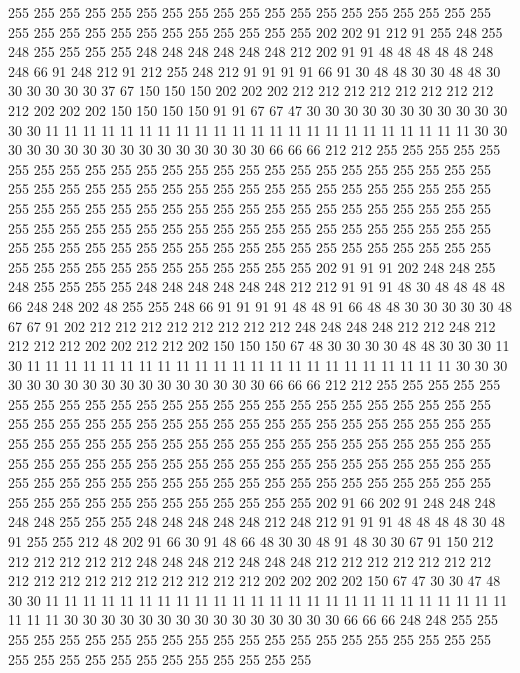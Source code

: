 255 255 255 255 255 255 255 255 255 255 255 255 255 255 255 255 255 255 255 255
255 255 255 255 255 255 255 255 255 255 255 202 202 91 212 91 255 248 255 248
255 255 255 255 248 248 248 248 248 248 212 202 91 91 48 48 48 48 48 248
248 66 91 248 212 91 212 255 248 212 91 91 91 91 66 91 30 48 48 30
30 48 48 30 30 30 30 30 30 37 67 150 150 150 202 202 202 212 212 212
212 212 212 212 212 212 202 202 202 150 150 150 150 91 91 67 67 47 30 30
30 30 30 30 30 30 30 30 30 30 30 11 11 11 11 11 11 11 11 11
11 11 11 11 11 11 11 11 11 11 11 11 11 11 30 30 30 30 30 30
30 30 30 30 30 30 30 30 30 30 66 66 66 212 212 255 255 255 255 255
255 255 255 255 255 255 255 255 255 255 255 255 255 255 255 255 255 255 255 255
255 255 255 255 255 255 255 255 255 255 255 255 255 255 255 255 255 255 255 255
255 255 255 255 255 255 255 255 255 255 255 255 255 255 255 255 255 255 255 255
255 255 255 255 255 255 255 255 255 255 255 255 255 255 255 255 255 255 255 255
255 255 255 255 255 255 255 255 255 255 255 255 255 255 255 255 255 255 255 255
255 255 255 255 255 255 255 202 91 91 91 202 248 248 255 248 255 255 255 255
248 248 248 248 248 248 212 212 91 91 91 48 30 48 48 48 48 66 248 248
202 48 255 255 248 66 91 91 91 91 48 48 91 66 48 48 30 30 30 30
30 48 67 67 91 202 212 212 212 212 212 212 212 212 248 248 248 248 212 212
248 212 212 212 212 202 202 212 212 202 150 150 150 67 48 30 30 30 30 48
48 30 30 30 11 30 11 11 11 11 11 11 11 11 11 11 11 11 11 11
11 11 11 11 11 11 11 11 11 30 30 30 30 30 30 30 30 30 30 30
30 30 30 30 30 30 66 66 66 212 212 255 255 255 255 255 255 255 255 255
255 255 255 255 255 255 255 255 255 255 255 255 255 255 255 255 255 255 255 255
255 255 255 255 255 255 255 255 255 255 255 255 255 255 255 255 255 255 255 255
255 255 255 255 255 255 255 255 255 255 255 255 255 255 255 255 255 255 255 255
255 255 255 255 255 255 255 255 255 255 255 255 255 255 255 255 255 255 255 255
255 255 255 255 255 255 255 255 255 255 255 255 255 255 255 255 255 255 255 255
255 255 255 202 91 66 202 91 248 248 248 248 248 255 255 255 248 248 248 248
248 212 248 212 91 91 91 48 48 48 48 30 48 91 255 255 212 48 202 91
66 30 91 48 66 48 30 30 48 91 48 30 30 67 91 150 212 212 212 212
212 212 248 248 248 212 248 248 248 212 212 212 212 212 212 212 212 212 212 212
212 212 212 212 212 212 202 202 202 202 150 67 47 30 30 47 48 30 30 11
11 11 11 11 11 11 11 11 11 11 11 11 11 11 11 11 11 11 11 11
11 11 11 11 11 11 11 30 30 30 30 30 30 30 30 30 30 30 30 30
30 30 66 66 66 248 248 255 255 255 255 255 255 255 255 255 255 255 255 255
255 255 255 255 255 255 255 255 255 255 255 255 255 255 255 255 255 255 255 255
